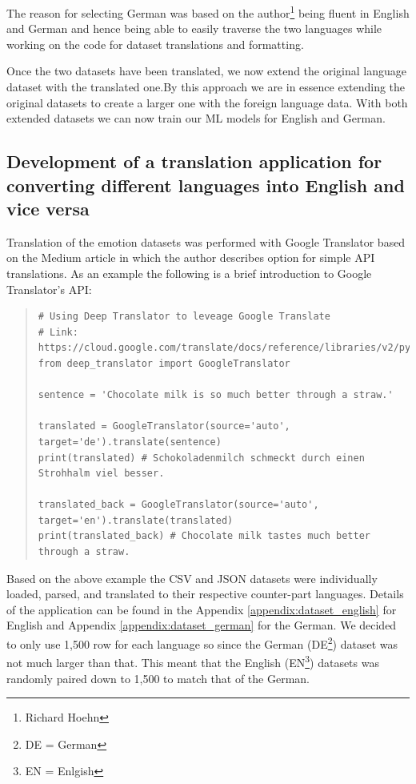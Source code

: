 \documentclass[11pt]{article}
\begin{document}
The reason for selecting German was based on the author\footnote{Richard Hoehn} being fluent in English and German and hence being able to easily traverse the two languages while working on the code for dataset translations and formatting.

Once the two datasets have been translated, we now extend the original language dataset with the translated one.By this approach we are in essence extending the original datasets to create a larger one with the foreign language data. With both extended datasets we can now train our ML models for English and German.

\subsection{Development of a translation application for converting different languages into English and vice versa}
Translation of the emotion datasets was performed with Google Translator based on the Medium article\cite{Nidhaloff_how_to_translate_text_with_python} in which the author describes option for simple API translations. As an example the following is a brief introduction to Google Translator's API:

\begin{quote}
\begin{verbatim}
# Using Deep Translator to leveage Google Translate
# Link: https://cloud.google.com/translate/docs/reference/libraries/v2/python
from deep_translator import GoogleTranslator

sentence = 'Chocolate milk is so much better through a straw.'

translated = GoogleTranslator(source='auto', target='de').translate(sentence)
print(translated) # Schokoladenmilch schmeckt durch einen Strohhalm viel besser.

translated_back = GoogleTranslator(source='auto', target='en').translate(translated)
print(translated_back) # Chocolate milk tastes much better through a straw.
\end{verbatim}
\end{quote}

Based on the above example the CSV and JSON datasets were individually loaded, parsed, and translated to their respective counter-part languages. Details of the application can be found in the Appendix \ref{appendix:dataset_english} for English and Appendix \ref{appendix:dataset_german} for the German. We decided to only use 1,500 row for each language so since the German (DE\footnote{DE = German}) dataset was not much larger than that. This meant that the English (EN\footnote{EN = Enlgish}) datasets was randomly paired down to 1,500 to match that of the German.
\end{document}
